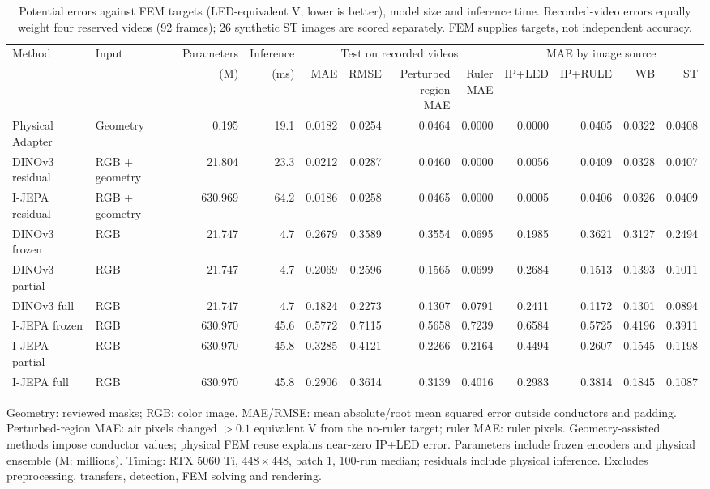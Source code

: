 \begin{table}[!t]
\centering\caption{Potential errors against FEM targets (LED-equivalent V; lower is better), model size and inference time. Recorded-video errors equally weight four reserved videos (92 frames); 26 synthetic ST images are scored separately. FEM supplies targets, not independent accuracy.}
\label{tab:all_models}
\setlength{\tabcolsep}{3pt}\footnotesize
\begin{tabular}{llrrrrrrrrrr}\toprule
Method & Input & Parameters & Inference & \multicolumn{4}{c}{Test on recorded videos} & \multicolumn{4}{c}{MAE by image source}\\
\cmidrule(lr){5-8}\cmidrule(lr){9-12}
 & & (M) & (ms) & MAE & RMSE & \shortstack{Perturbed\\region MAE} & \shortstack{Ruler\\MAE} & IP+LED & IP+RULE & WB & ST\\\midrule
Physical Adapter & Geometry & 0.195 & 19.1 & 0.0182 & 0.0254 & 0.0464 & 0.0000 & 0.0000 & 0.0405 & 0.0322 & 0.0408\\
DINOv3 residual & RGB + geometry & 21.804 & 23.3 & 0.0212 & 0.0287 & 0.0460 & 0.0000 & 0.0056 & 0.0409 & 0.0328 & 0.0407\\
I-JEPA residual & RGB + geometry & 630.969 & 64.2 & 0.0186 & 0.0258 & 0.0465 & 0.0000 & 0.0005 & 0.0406 & 0.0326 & 0.0409\\
\midrule
DINOv3 frozen & RGB & 21.747 & 4.7 & 0.2679 & 0.3589 & 0.3554 & 0.0695 & 0.1985 & 0.3621 & 0.3127 & 0.2494\\
DINOv3 partial & RGB & 21.747 & 4.7 & 0.2069 & 0.2596 & 0.1565 & 0.0699 & 0.2684 & 0.1513 & 0.1393 & 0.1011\\
DINOv3 full & RGB & 21.747 & 4.7 & 0.1824 & 0.2273 & 0.1307 & 0.0791 & 0.2411 & 0.1172 & 0.1301 & 0.0894\\
I-JEPA frozen & RGB & 630.970 & 45.6 & 0.5772 & 0.7115 & 0.5658 & 0.7239 & 0.6584 & 0.5725 & 0.4196 & 0.3911\\
I-JEPA partial & RGB & 630.970 & 45.8 & 0.3285 & 0.4121 & 0.2266 & 0.2164 & 0.4494 & 0.2607 & 0.1545 & 0.1198\\
I-JEPA full & RGB & 630.970 & 45.8 & 0.2906 & 0.3614 & 0.3139 & 0.4016 & 0.2983 & 0.3814 & 0.1845 & 0.1087\\
\bottomrule\end{tabular}
\par\smallskip\begin{minipage}{.98\textwidth}\footnotesize Geometry: reviewed masks; RGB: color image. MAE/RMSE: mean absolute/root mean squared error outside conductors and padding. Perturbed-region MAE: air pixels changed $>0.1$ equivalent V from the no-ruler target; ruler MAE: ruler pixels. Geometry-assisted methods impose conductor values; physical FEM reuse explains near-zero IP+LED error. Parameters include frozen encoders and physical ensemble (M: millions). Timing: RTX 5060 Ti, $448\times448$, batch 1, 100-run median; residuals include physical inference. Excludes preprocessing, transfers, detection, FEM solving and rendering.\end{minipage}
\end{table}
